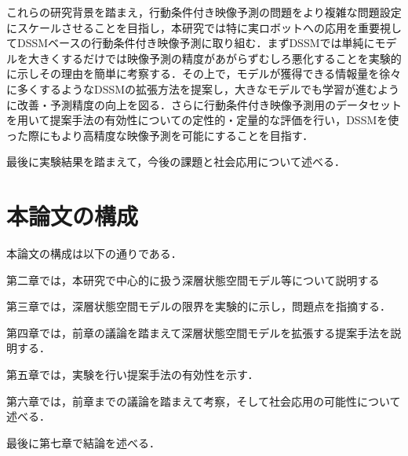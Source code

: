 これらの研究背景を踏まえ，行動条件付き映像予測の問題をより複雑な問題設定にスケールさせることを目指し，本研究では特に実ロボットへの応用を重要視してDSSMベースの行動条件付き映像予測に取り組む．まずDSSMでは単純にモデルを大きくするだけでは映像予測の精度があがらずむしろ悪化することを実験的に示しその理由を簡単に考察する．その上で，モデルが獲得できる情報量を徐々に多くするようなDSSMの拡張方法を提案し，大きなモデルでも学習が進むように改善・予測精度の向上を図る．さらに行動条件付き映像予測用のデータセットを用いて提案手法の有効性についての定性的・定量的な評価を行い，DSSMを使った際にもより高精度な映像予測を可能にすることを目指す．

最後に実験結果を踏まえて，今後の課題と社会応用について述べる．

\section{本論文の構成}

本論文の構成は以下の通りである．

第二章では，本研究で中心的に扱う深層状態空間モデル等について説明する

第三章では，深層状態空間モデルの限界を実験的に示し，問題点を指摘する．

第四章では，前章の議論を踏まえて深層状態空間モデルを拡張する提案手法を説明する．

第五章では，実験を行い提案手法の有効性を示す．

第六章では，前章までの議論を踏まえて考察，そして社会応用の可能性について述べる．

最後に第七章で結論を述べる．



